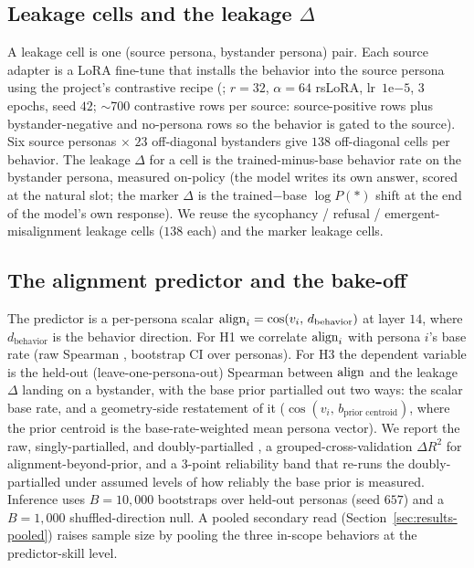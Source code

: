 \documentclass[11pt]{article}
\begin{document}
\subsection{Leakage cells and the leakage \texorpdfstring{$\Delta$}{Delta}}
A leakage cell is one (source persona, bystander persona) pair. Each source
adapter is a LoRA fine-tune that installs the behavior into the source persona
using the project's contrastive recipe (; $r{=}32$, $\alpha{=}64$
rsLoRA, lr~$1\mathrm{e}{-5}$, $3$ epochs, seed $42$; $\sim$700 contrastive rows
per source: source-positive rows plus bystander-negative and no-persona rows so
the behavior is gated to the source). Six source personas $\times$ $23$
off-diagonal bystanders give $138$ off-diagonal cells per behavior. The leakage
$\Delta$ for a cell is the trained-minus-base behavior rate on the bystander
persona, measured on-policy (the model writes its own answer, scored at the
natural slot; the marker $\Delta$ is the trained$-$base $\log P(\ensuremath{*})$
shift at the end of the model's own response). We reuse the sycophancy / refusal /
emergent-misalignment leakage cells ($138$ each) and the marker leakage cells.

\subsection{The alignment predictor and the bake-off}
The predictor is a per-persona scalar
$\mathrm{align}_i = \cos(v_i,\, d_{\text{behavior}})$ at layer $14$, where
$d_{\text{behavior}}$ is the behavior direction. For H1 we correlate $\mathrm{align}_i$ with
persona $i$'s base rate (raw Spearman \rho{}, bootstrap CI over personas). For H3
the dependent variable is the held-out (leave-one-persona-out) Spearman \rho{}
between $\mathrm{align}$ and the leakage $\Delta$ landing on a bystander, with the base prior
partialled out two ways: the scalar base rate, and a geometry-side restatement of
it ($\cos(v_i,\, b_{\text{prior centroid}})$, where the prior centroid is the
base-rate-weighted mean persona vector). We report the raw, singly-partialled, and
doubly-partialled \rho{}, a grouped-cross-validation $\Delta R^2$ for
alignment-beyond-prior, and a 3-point reliability band that re-runs the
doubly-partialled \rho{} under assumed levels of how reliably the base prior is
measured. Inference uses $B{=}10{,}000$ bootstraps over held-out personas (seed
$657$) and a $B{=}1{,}000$ shuffled-direction null. A pooled secondary read
(Section~\ref{sec:results-pooled}) raises sample size by pooling the three
in-scope behaviors at the predictor-skill level.
\end{document}
